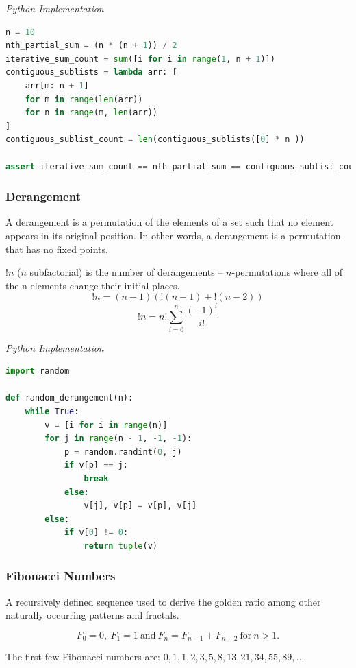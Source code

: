 \documentclass{article}
\begin{document}
\vspace{8pt} \emph{Python Implementation}
\begin{lstlisting}[language=Python]
n = 10
nth_partial_sum = (n * (n + 1)) / 2 
iterative_sum_count = sum([i for i in range(1, n + 1)])
contiguous_sublists = lambda arr: [
    arr[m: n + 1] 
    for m in range(len(arr)) 
    for n in range(m, len(arr))
]
contiguous_sublist_count = len(contiguous_sublists([0] * n ))

assert iterative_sum_count == nth_partial_sum == contiguous_sublist_count
\end{lstlisting}

    \subsubsection{Derangement}
    A derangement is a permutation of the elements of a set such that no element appears in its original position. In other words, a derangement is a permutation that has no fixed points.
    
    $!n$ ($n$ subfactorial) is the number of derangements -- $n$-permutations where all of the n elements change their initial places.
    \[
        !n=(n-1)({!(n-1)}+{!(n-2)})
    \]
    \[
        !n=n!\sum_{i=0}^{n}{\frac {(-1)^{i}}{i!}}
    \]
    
\vspace{8pt} \emph{Python Implementation}
\begin{lstlisting}[language=Python]
import random

def random_derangement(n):
    while True:
        v = [i for i in range(n)]
        for j in range(n - 1, -1, -1):
            p = random.randint(0, j)
            if v[p] == j:
                break
            else:
                v[j], v[p] = v[p], v[j]
        else:
            if v[0] != 0:
                return tuple(v)
\end{lstlisting}

    \subsubsection{Fibonacci Numbers}
    A recursively defined sequence used to derive the golden ratio among other naturally occurring patterns and fractals.
    
    \[
         F_{0}=0, \ F_{1}=1 \ \text{and} \ 
        F_{n}=F_{n-1}+F_{n-2} \ \text{for}  \ n > 1.
    \]
    
    The first few Fibonacci numbers are: $0, 1, 1, 2, 3, 5, 8, 13, 21, 34, 55, 89, \dots$
    
\end{document}
